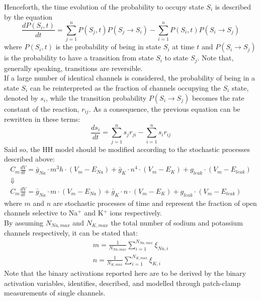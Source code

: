Henceforth, the time evolution of the probability to occupy state \(S_{i}\) is described by the
equation
\begin{equation*}
    \frac{dP(S_{i},t)}{dt}
    =\sum_{j=1}^{n}P(S_{j},t)P(S_{j}\rightarrow{S_{i}})-\sum_{i=1}^{n}P(S_{i},t)P(S_{i}\rightarrow{S_{j}})
\end{equation*}
where \(P(S_{i},t)\) is the probability of being in state \(S_{i}\) at time \(t\) and
\(P(S_{i}\rightarrow{S_{j}})\) is the probability to have a transition from state \(S_{i}\)
to state \(S_{j}\). Note that, generally speaking, transitions are reversible.\\
If a large number of identical channels is considered, the probability of being in a state \(S_{i}\) can
be reinterpreted as the fraction of channels occupying the \(S_{i}\) state, denoted by \(s_{i}\), while
the transition probability \(P(S_{i}\rightarrow{S_{j}})\) becomes the rate constant of the reaction, \(r_{ij}\).
As a consequence, the previous equation can be rewritten in these terms:
\begin{equation*}
    \frac{ds_{i}}{dt}=\sum_{j=1}^{n}s_{j}r_{ji}-\sum_{i=1}^{n}s_{i}r_{ij}
\end{equation*}
Said so, the HH model should be modified according to the stochastic processes described above:
\begin{gather*}
    C_{m}\frac{dV}{dt}
    =\bar{g}_{Na}\cdot{m^{3}h}\cdot{(V_{m}-E_{Na})}
    +\bar{g}_{K}\cdot{n^{4}}\cdot{(V_{m}-E_{K})}
    +g_{leak}\cdot{(V_{m}-E_{leak})}\\
    \Downarrow\\
    C_{m}\frac{dV}{dt}
    =\bar{g}_{Na}\cdot{m}\cdot{(V_{m}-E_{Na})}
    +\bar{g}_{K}\cdot{n}\cdot{(V_{m}-E_{K})}
    +g_{leak}\cdot{(V_{m}-E_{leak})}
\end{gather*}
where \(m\) and \(n\) are stochastic processes of time and represent the fraction of open channels
selective to Na\({}^{+}\) and K\({}^{+}\) ions respectively.\\
By assuming \(N_{Na,max}\) and \(N_{K,max}\) the total number of sodium and potassium channels
respectively, it can be stated that:
\begin{gather*}
    m=\frac{1}{N_{Na,max}}\sum_{i=1}^{N_{Na,max}}\xi_{Na,i}\\
    n=\frac{1}{N_{K,max}}\sum_{i=1}^{N_{K,max}}\xi_{K,i}
\end{gather*}
Note that the binary activations reported here are to be derived by the binary activation variables,
identifies, described, and modelled through patch-clamp measurements of single channels.\\
